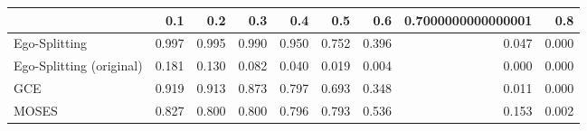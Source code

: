 \begin{tabular}{lrrrrrrrr}
\toprule
{} &   0.1 &   0.2 &   0.3 &   0.4 &   0.5 &   0.6 & 0.7000000000000001 &   0.8 \\
\midrule
Ego-Splitting            & 0.997 & 0.995 & 0.990 & 0.950 & 0.752 & 0.396 &              0.047 & 0.000 \\
Ego-Splitting (original) & 0.181 & 0.130 & 0.082 & 0.040 & 0.019 & 0.004 &              0.000 & 0.000 \\
GCE                      & 0.919 & 0.913 & 0.873 & 0.797 & 0.693 & 0.348 &              0.011 & 0.000 \\
MOSES                    & 0.827 & 0.800 & 0.800 & 0.796 & 0.793 & 0.536 &              0.153 & 0.002 \\
\bottomrule
\end{tabular}
